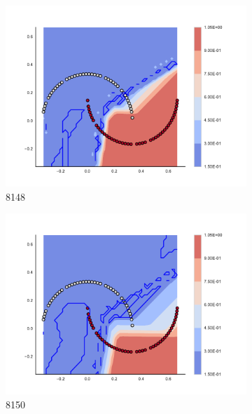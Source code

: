 \begin{figure}[h]
\begin{subfigure}[b]{0.09\textwidth}
    \includegraphics[clip, trim=2.35cm 1.75cm 4.5cm 0cm,width=\textwidth]{img/convergence/8148.pdf}
    \caption{8148}
    \label{fig:convergence_8148}
\end{subfigure}
%
\begin{subfigure}[b]{0.09\textwidth}
    \includegraphics[clip, trim=2.35cm 1.75cm 4.5cm 0cm,width=\textwidth]{img/convergence/8150.pdf}
    \caption{8150}
    \label{fig:convergence_8150}
\end{subfigure}
%
\begin{subfigure}[b]{0.09\textwidth}

\end{subfigure}
\end{figure}
